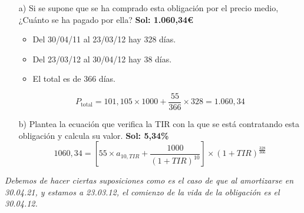 \begin{enumerate}
\begin{tikzpicture}
    
    
    
    
    
    \end{tikzpicture}
    
    \begin{enumerate}
        \item[a)] Si se supone que se ha comprado esta obligación por el precio medio, ¿Cuánto se ha pagado por ella? \textbf{Sol: 1.060,34€}
        
        \begin{itemize}
            \item Del 30/04/11 al 23/03/12 hay 328 días.
            \item Del 23/03/12 al 30/04/12 hay 38 días.
            \item El total es de 366 días.
        \end{itemize}

        \begin{equation*}
            P_{\text{total}} = 101,105 \times 1000 + \frac{55}{366} \times 328 = 1.060,34
        \end{equation*}
        \item[b)] Plantea la ecuación que verifica la TIR con la que se está contratando esta obligación y calcula su valor. \textbf{Sol: 5,34\%}
        \begin{equation*}
            1060,34 = \left[55 \times a_{10,TIR}+\frac{1000}{(1+TIR)^{10}}\right]\times(1+TIR)^{\frac{328}{366}}
        \end{equation*}
    \end{enumerate}
\end{enumerate}

\textit{Debemos de hacer ciertas suposiciones como es el caso de que al amortizarse en 30.04.21, y estamos a 23.03.12, el comienzo de la vida de la obligación es el 30.04.12.}
\\\\

